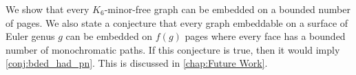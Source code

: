 We show that every $K_6$-minor-free graph can be embedded on a bounded number of pages. We also state a conjecture that every graph embeddable on a surface of Euler genus $g$ can be embedded on $f(g)$ pages where every face has a bounded number of monochromatic paths. If this conjecture is true, then it would imply \cref{conj:bded_had_pn}. This is discussed in \cref{chap:Future Work}.